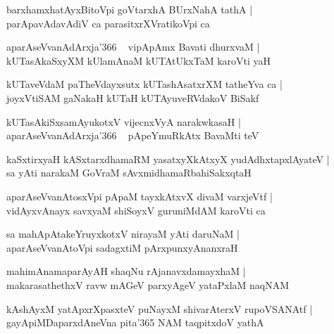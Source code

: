 \documentclass[twoside,12pt,openright]{book}
\newcounter{shloka}[chapter]
\begin{document}
\begin{shloka}%
barxhamxhatAyxBitoVpi goVtarxhA BUrxNahA tathA |\\
parApavAdavAdiV ca parasitxrXVratikoVpi ca 
\end{shloka}

\begin{shloka}%
aparAseVvanAdArxja\char'366 ~ vipApAmx Bavati dhurxvaM |\\
kUTasAkaSxyXM kUlamAnaM kUTAtUkxTaM karoVti yaH 
\end{shloka}

\begin{shloka}%
kUTaveVdaM paTheVdayxsutx kUTashAsatxrXM tatheYva ca |\\
joyxVtiSAM gaNakaH kUTaH kUTAyuveRVdakoV BiSakf
\end{shloka}

\begin{shloka}%
kUTasAkiSxsamAyukotxV vijecnxVyA narakwkasaH |\\
aparAseVvanAdArxja\char'366 ~ pApeYmuRkAtx BavaMti teV 
\end{shloka}

\begin{shloka}%
kaSxtirxyaH kASxtarxdhamaRM yasatxyXkAtxyX yudAdhxtapxlAyateV |\\
sa yAti narakaM GoVraM sAvxmidhamaRbahiSakxqtaH 
\end{shloka}

\begin{shloka}%
aparAseVvanAtosxVpi pApaM tayxkAtxvX divaM varxjeVtf |\\
vidAyxvAnayx savxyaM shiSoyxV guruniMdAM karoVti ca 
\end{shloka}

\begin{shloka}%
sa mahApAtakeYruyxkotxV nirayaM yAti daruNaM |\\
aparAseVvanAtoVpi sadagxtiM pArxpunxyAnanxraH 
\end{shloka}

\begin{shloka}%
mahimAnamaparAyAH shaqNu rAjanavxdamayxhaM |\\
makarasathethxV ravw mAGeV parxyAgeV yataPxlaM naqNAM 
\end{shloka}

\begin{shloka}%
kAshAyxM yatApxrXpasxteV puNayxM shivarAterxV rupoVSANAtf |\\
gayApiMDaparxdAneVna pita\char'365 NAM taqpitxdoV yathA 
\end{shloka}
\end{document}
